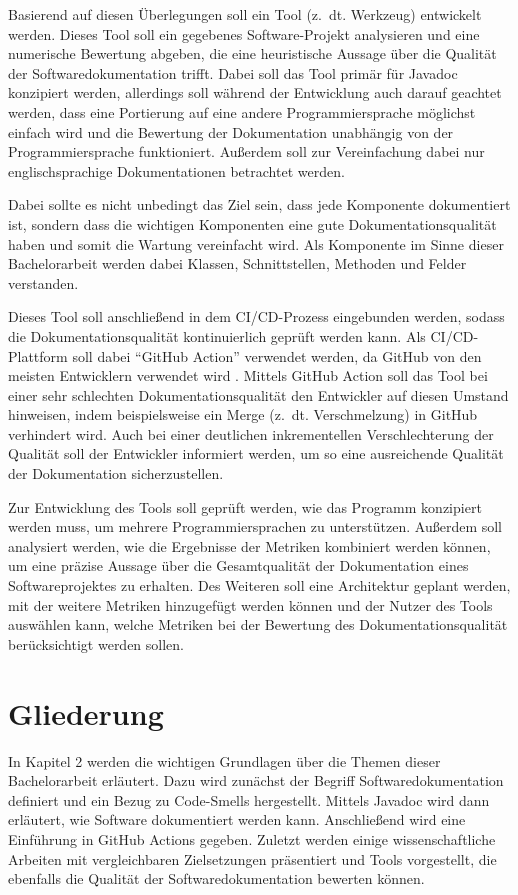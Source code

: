 \hfill

Basierend auf diesen Überlegungen soll ein Tool (z.~dt. Werkzeug) entwickelt werden. Dieses Tool soll ein gegebenes Software-Projekt analysieren und eine numerische Bewertung abgeben, die eine heuristische Aussage über die Qualität der Softwaredokumentation trifft.  Dabei soll das Tool primär für Javadoc konzipiert werden, allerdings soll während der Entwicklung auch darauf geachtet werden, dass eine Portierung auf eine andere Programmiersprache möglichst einfach wird und die Bewertung der Dokumentation unabhängig von der Programmiersprache funktioniert. Außerdem soll zur Vereinfachung dabei nur englischsprachige Dokumentationen betrachtet werden.

Dabei sollte es nicht unbedingt das Ziel sein, dass jede Komponente dokumentiert ist, sondern dass die wichtigen Komponenten eine gute Dokumentationsqualität haben und somit die Wartung vereinfacht wird.  Als Komponente im Sinne dieser Bachelorarbeit werden dabei Klassen, Schnittstellen, Methoden und Felder verstanden. 

Dieses Tool soll anschließend in dem \ac{CI/CD}-Prozess eingebunden werden, sodass die Dokumentationsqualität kontinuierlich geprüft werden kann. Als \ac{CI/CD}-Plattform soll dabei \enquote{GitHub Action} verwendet werden, da GitHub von den meisten Entwicklern verwendet wird \cite{github_popular}. Mittels GitHub Action soll das Tool bei einer sehr schlechten Dokumentationsqualität den Entwickler auf diesen Umstand hinweisen, indem beispielsweise ein Merge (z.~dt. Verschmelzung) in GitHub verhindert wird. Auch bei einer deutlichen inkrementellen Verschlechterung der Qualität soll der Entwickler informiert werden, um so eine ausreichende Qualität der Dokumentation sicherzustellen. 

Zur Entwicklung des Tools soll geprüft werden, wie das Programm konzipiert werden muss, um mehrere Programmiersprachen zu unterstützen. Außerdem soll analysiert werden, wie die Ergebnisse der Metriken kombiniert werden können, um eine präzise Aussage über die Gesamtqualität der Dokumentation eines Softwareprojektes zu erhalten. Des Weiteren soll eine Architektur geplant werden, mit der weitere Metriken hinzugefügt werden können und der Nutzer des Tools auswählen kann, welche Metriken bei der Bewertung des Dokumentationsqualität berücksichtigt werden sollen.


\section{Gliederung}
In Kapitel 2 werden die wichtigen Grundlagen über die Themen dieser Bachelorarbeit erläutert. Dazu  wird zunächst der Begriff Softwaredokumentation definiert und ein Bezug zu Code-Smells hergestellt. Mittels Javadoc wird dann erläutert, wie Software dokumentiert werden kann. Anschließend wird eine Einführung in GitHub Actions gegeben. Zuletzt werden einige wissenschaftliche Arbeiten mit vergleichbaren Zielsetzungen präsentiert und Tools vorgestellt, die ebenfalls die Qualität der Softwaredokumentation bewerten können.

